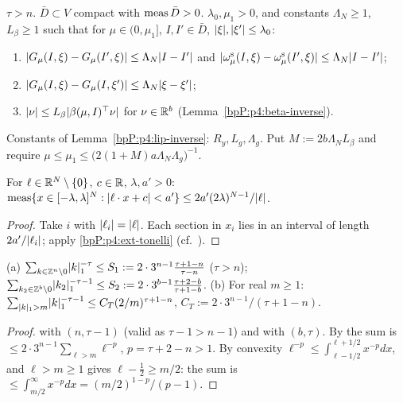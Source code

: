 \begin{definition}\label{bpP:p4:data}
$\tau>n$. $\bar D\subset V$ compact with $\operatorname{meas}\bar D>0$. $\lambda_0,\mu_1>0$, and constants $\Lambda_N\ge1$, $L_\beta\ge1$ such that for $\mu\in(0,\mu_1]$, $I,I'\in\bar D$, $\lvert \xi\rvert,\lvert \xi'\rvert\le\lambda_0$:
\begin{enumerate}[label=(N\arabic*)]
\item $\lvert G_\mu(I,\xi)-G_\mu(I',\xi)\rvert\le\Lambda_N\lvert I-I'\rvert$ and $\lvert \omega^{\rm s}_\mu(I,\xi)-\omega^{\rm s}_\mu(I',\xi)\rvert\le\Lambda_N\lvert I-I'\rvert$;
\item $\lvert G_\mu(I,\xi)-G_\mu(I,\xi')\rvert\le\Lambda_N\lvert \xi-\xi'\rvert$;
\item $\lvert \nu\rvert\le L_\beta\lvert \beta(\mu,I)^\top\nu\rvert$ for $\nu\in\mathbb{R}^b$ (Lemma~\ref{bpP:p4:beta-inverse}).
\end{enumerate}
Constants of Lemma~\ref{bpP:p4:lip-inverse}: $R_y,L_g,\Lambda_g$. Put $M:=2b\Lambda_NL_\beta$ and require $\mu\le\mu_1\le\bigl(2(1+M)a\Lambda_N\Lambda_g\bigr)^{-1}$.
\end{definition}

\begin{lemma}\label{bpP:p4:affine-slab}
For $\ell\in\mathbb{R}^N\setminus\{0\}$, $c\in\mathbb{R}$, $\lambda,a'>0$: $\operatorname{meas}\{x\in[-\lambda,\lambda]^N:\lvert \ell\cdot x+c\rvert<a'\}\le2a'(2\lambda)^{N-1}/\lvert \ell\rvert$.
\end{lemma}
\begin{proof}
Take $i$ with $\lvert \ell_i\rvert=\lvert \ell\rvert$. Each section in $x_i$ lies in an interval of length $2a'/\lvert \ell_i\rvert$; apply \ref{bpP:p4:ext-tonelli} (cf.\ ).
\end{proof}

\begin{lemma}\label{bpP:p4:lattice-tail}
(a) $\sum_{k\in\mathbb{Z}^n\setminus0}\lvert k\rvert_1^{-\tau}\le S_1:=2\cdot3^{n-1}\frac{\tau+1-n}{\tau-n}$ ($\tau>n$); $\sum_{k_2\in\mathbb{Z}^b\setminus0}\lvert k_2\rvert_1^{-\tau-1}\le S_2:=2\cdot3^{b-1}\frac{\tau+2-b}{\tau+1-b}$.
(b) For real $m\ge1$: $\sum_{\lvert k\rvert_1>m}\lvert k\rvert_1^{-\tau-1}\le C_T(2/m)^{\tau+1-n}$, $C_T:=2\cdot3^{n-1}/(\tau+1-n)$.
\end{lemma}
\begin{proof}
\label{stepP:p4:lt-a}  with $(n,\tau-1)$ (valid as $\tau-1>n-1$) and with $(b,\tau)$.
\label{stepP:p4:lt-b} By  the sum is $\le2\cdot3^{n-1}\sum_{\ell>m}\ell^{-p}$, $p=\tau+2-n>1$. By convexity $\ell^{-p}\le\int_{\ell-1/2}^{\ell+1/2}x^{-p}dx$, and $\ell>m\ge1$ gives $\ell-\frac12\ge m/2$: the sum is $\le\int_{m/2}^\infty x^{-p}dx=(m/2)^{1-p}/(p-1)$.
\end{proof}

